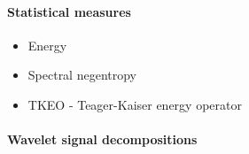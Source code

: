 \cite{zheng_feature_2018}
\cite{johnson_feature_2019}

\cite{mostafavi_novel_2021}

\cite{altaf_new_2022}


\cite{brito_fault_2021}




\cite{peeters_large_2004}
\cite{zhuo_research_2022}
\cite{mohammadi_early_2020}
\cite{egaji_data_2020}
\cite{nandi_condition_2019}
\cite{jung_vibration_2017}

\paragraph{Statistical measures}
\begin{itemize}
\item Energy
\item Spectral negentropy
	\cite{avoci_spectral_2020}
\item TKEO - Teager-Kaiser energy operator
	\cite{shi_application_2022}
\end{itemize}

\paragraph{Wavelet signal decompositions}

